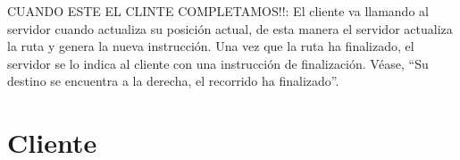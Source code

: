 CUANDO ESTE EL CLINTE COMPLETAMOS!!:
El cliente va llamando al servidor cuando actualiza su posición actual, de esta manera el servidor actualiza la ruta y genera la nueva instrucción. Una vez que la ruta ha finalizado, el servidor se lo indica al cliente con una instrucción de finalización. Véase, ``Su destino se encuentra a la derecha, el recorrido ha finalizado''.

\section{Cliente}